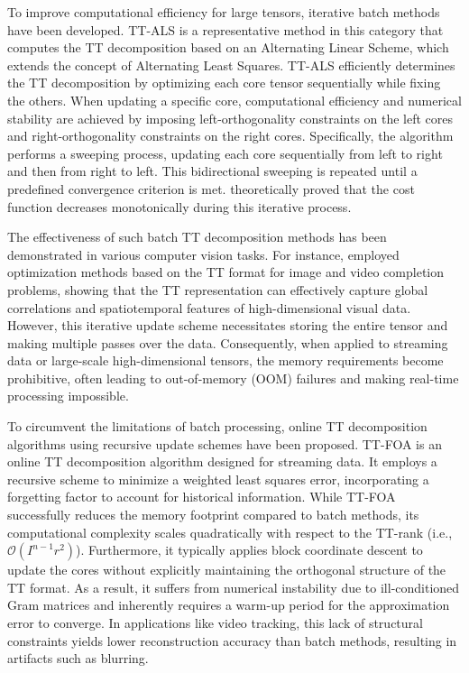 \documentclass[a4paper, 11pt]{article}
\theoremstyle{plain}
\theoremstyle{definition}
\theoremstyle{remark}
\begin{document}
To improve computational efficiency for large tensors, iterative batch methods have been developed.
TT-ALS \citep{TT-ALS} is a representative method in this category that computes the TT decomposition based on an Alternating Linear Scheme, which extends the concept of Alternating Least Squares.
TT-ALS efficiently determines the TT decomposition by optimizing each core tensor sequentially while fixing the others.
When updating a specific core, computational efficiency and numerical stability are achieved by imposing left-orthogonality constraints on the left cores and right-orthogonality constraints on the right cores.
Specifically, the algorithm performs a sweeping process, updating each core sequentially from left to right and then from right to left.
This bidirectional sweeping is repeated until a predefined convergence criterion is met.
\citet{TT-ALS} theoretically proved that the cost function decreases monotonically during this iterative process.

The effectiveness of such batch TT decomposition methods has been demonstrated in various computer vision tasks.
For instance, \citet{TT-Video-Completion} employed optimization methods based on the TT format for image and video completion problems, showing that the TT representation can effectively capture global correlations and spatiotemporal features of high-dimensional visual data.
However, this iterative update scheme necessitates storing the entire tensor and making multiple passes over the data.
Consequently, when applied to streaming data or large-scale high-dimensional tensors, the memory requirements become prohibitive, often leading to out-of-memory (OOM) failures and making real-time processing impossible.

To circumvent the limitations of batch processing, online TT decomposition algorithms using recursive update schemes have been proposed.
TT-FOA \citep{TT-FOA} is an online TT decomposition algorithm designed for streaming data.
It employs a recursive scheme to minimize a weighted least squares error, incorporating a forgetting factor to account for historical information.
While TT-FOA successfully reduces the memory footprint compared to batch methods, its computational complexity scales quadratically with respect to the TT-rank (i.e., $\mathcal{O}(I^{n-1} r^2)$).
Furthermore, it typically applies block coordinate descent to update the cores without explicitly maintaining the orthogonal structure of the TT format.
As a result, it suffers from numerical instability due to ill-conditioned Gram matrices and inherently requires a warm-up period for the approximation error to converge.
In applications like video tracking, this lack of structural constraints yields lower reconstruction accuracy than batch methods, resulting in artifacts such as blurring.
\end{document}
